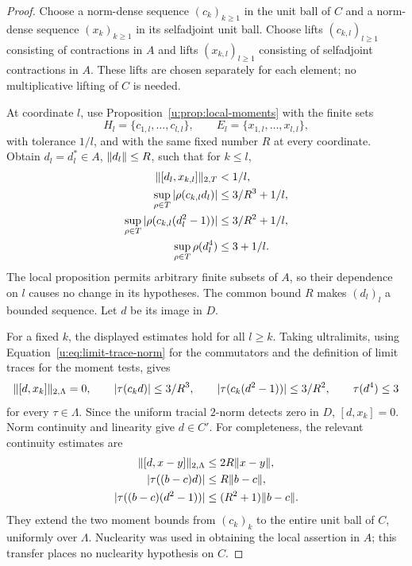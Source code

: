 \begin{proof}
Choose a norm-dense sequence $(c_k)_{k\geq1}$ in the unit ball of $C$
and a norm-dense sequence $(x_k)_{k\geq1}$ in its selfadjoint unit ball.
Choose lifts $(c_{k,l})_{l\geq1}$ consisting of contractions in $A$ and
lifts $(x_{k,l})_{l\geq1}$ consisting of selfadjoint contractions in $A$.
These lifts are chosen separately for each element; no multiplicative
lifting of $C$ is needed.

At coordinate $l$, use Proposition~\ref{u:prop:local-moments} with the
finite sets
\[
  H_l=\{c_{1,l},\ldots,c_{l,l}\},\qquad
  E_l=\{x_{1,l},\ldots,x_{l,l}\},
\]
with tolerance $1/l$, and with the same fixed number $R$ at every
coordinate.  Obtain $d_l=d_l^*\in A$, $\lVert d_l\rVert\leq R$, such that
for $k\leq l$,
\begin{align*}
  \lVert[d_l,x_{k,l}]\rVert_{2,T}&<1/l,\\
  \sup_{\rho\in T}|\rho(c_{k,l}d_l)|&\leq3/R^3+1/l,\\
  \sup_{\rho\in T}|\rho(c_{k,l}(d_l^2-1))|&\leq3/R^2+1/l,\\
  \sup_{\rho\in T}\rho(d_l^4)&\leq3+1/l.
\end{align*}
The local proposition permits arbitrary finite subsets of $A$, so their
dependence on $l$ causes no change in its hypotheses.  The common bound
$R$ makes $(d_l)_l$ a bounded sequence.  Let $d$ be its image in $D$.

For a fixed $k$, the displayed estimates hold for all $l\geq k$.
Taking ultralimits, using Equation~\eqref{u:eq:limit-trace-norm} for the
commutators and the definition of limit traces for the moment tests,
gives
\[
  \lVert[d,x_k]\rVert_{2,\Lambda}=0,
  \qquad |\tau(c_kd)|\leq3/R^3,
  \qquad |\tau(c_k(d^2-1))|\leq3/R^2,
  \qquad \tau(d^4)\leq3
\]
for every $\tau\in\Lambda$.  Since the uniform tracial $2$-norm
detects zero in $D$, $[d,x_k]=0$.  Norm continuity and linearity give
$d\in C'$.  For completeness, the relevant continuity estimates are
\[
\begin{split}
  \lVert[d,x-y]\rVert_{2,\Lambda}&\leq2R\lVert x-y\rVert,\\
  |\tau((b-c)d)|&\leq R\lVert b-c\rVert,\\
  |\tau((b-c)(d^2-1))|&\leq(R^2+1)\lVert b-c\rVert.
\end{split}
\]
They extend the two moment bounds from $(c_k)_k$ to the entire unit
ball of $C$, uniformly over $\Lambda$.  Nuclearity was used in obtaining
the local assertion in $A$; this transfer places no nuclearity
hypothesis on $C$.
\end{proof}

